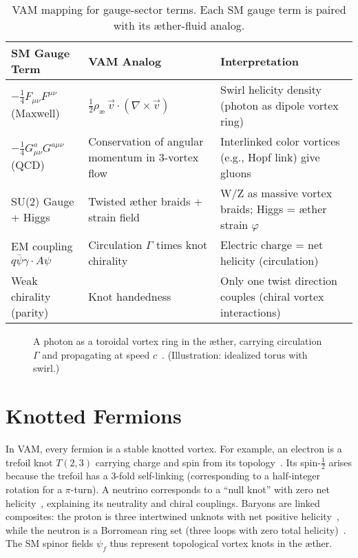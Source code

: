\documentclass[a4paper,12pt]{article}
\begin{document}
\begin{table}[H]
    \centering
    \begin{tabular}{lll}
        \toprule
        \textbf{SM Gauge Term} & \textbf{VAM Analog} & \textbf{Interpretation} \\
        \midrule
        $-\tfrac{1}{4} F_{\mu\nu}F^{\mu\nu}$ (Maxwell) & $\tfrac{1}{2}\rho_{æ}\,\vec{v}\cdot(\nabla\times\vec{v})$~\cite{vam-lagrangian} & Swirl helicity density (photon as dipole vortex ring) \\
        $-\tfrac{1}{4} G^a_{\mu\nu}G^{a\mu\nu}$ (QCD) & Conservation of angular momentum in 3-vortex flow~\cite{vam-lagrangian} & Interlinked color vortices (e.g., Hopf link) give gluons \\
        SU(2) Gauge + Higgs & Twisted æther braids + strain field & W/Z as massive vortex braids; Higgs = æther strain $\varphi$ \\
        EM coupling $q\bar{\psi}\gamma\cdot A\psi$ & Circulation $\Gamma$ times knot chirality & Electric charge = net helicity (circulation)~\cite{vam-helicity} \\
        Weak chirality (parity) & Knot handedness & Only one twist direction couples (chiral vortex interactions)~\cite{vam-weak} \\
        \bottomrule
    \end{tabular}
    \caption{VAM mapping for gauge-sector terms. Each SM gauge term is paired with its æther-fluid analog.}
    \label{tab:gauge-map}
\end{table}

\begin{figure}[H]
    \centering
    \caption{A photon as a toroidal vortex ring in the æther, carrying circulation $\Gamma$ and propagating at speed $c$~\cite{vam-helicity}. (Illustration: idealized torus with swirl.)}
    \label{fig:photon-vortex}
\end{figure}

\chapter*{Knotted Fermions}

In VAM, every fermion is a stable knotted vortex. For example, an electron is a trefoil knot $T(2,3)$ carrying charge and spin from its topology~\cite{vam-helicity}. Its spin-$\frac{1}{2}$ arises because the trefoil has a $3$-fold self-linking (corresponding to a half-integer rotation for a $\pi$-turn). A neutrino corresponds to a ``null knot'' with zero net helicity~\cite{vam-helicity}, explaining its neutrality and chiral couplings. Baryons are linked composites: the proton is three intertwined unknots with net positive helicity~\cite{vam-helicity}, while the neutron is a Borromean ring set (three loops with zero total helicity)~\cite{vam-helicity}. The SM spinor fields $\psi_f$ thus represent topological vortex knots in the æther.
\end{document}
